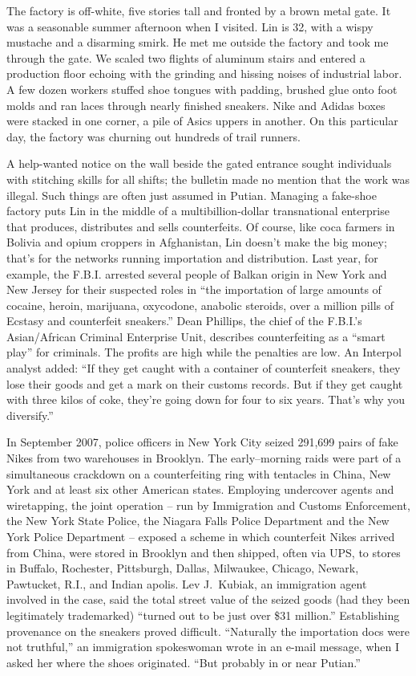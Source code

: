 ﻿\documentclass[12pt]{article}
\begin{document}
The factory is off-white, five stories tall and fronted by a brown metal gate. It was a seasonable
summer afternoon when I visited. Lin is 32, with a wispy mustache and a disarming smirk. He met me
outside the factory and took me through the gate. We scaled two flights of aluminum stairs and
entered a production floor echoing with the grinding and hissing noises of industrial labor. A few
dozen workers stuffed shoe tongues with padding, brushed glue onto foot molds and ran laces through
nearly finished sneakers. Nike and Adidas boxes were stacked in one corner, a pile of Asics uppers
in another. On this particular day, the factory was churning out hundreds of trail runners.

A help-wanted notice on the wall beside the gated entrance sought individuals with stitching skills
for all shifts; the bulletin made no mention that the work was illegal. Such things are often just
assumed in Putian. Managing a fake-shoe factory puts Lin in the middle of a multibillion-dollar
transnational enterprise that produces, distributes and sells counterfeits. Of course, like coca
farmers in Bolivia and opium croppers in Afghanistan, Lin doesn't make the big money; that's for the
networks running importation and distribution. Last year, for example, the F.B.I. arrested several
people of Balkan origin in New York and New Jersey for their suspected roles in ``the importation of
large amounts of cocaine, heroin, marijuana, oxycodone, anabolic steroids, over a million pills of
Ecstasy and counterfeit sneakers.'' Dean Phillips, the chief of the F.B.I.'s Asian/African Criminal
Enterprise Unit, describes counterfeiting as a ``smart play'' for criminals. The profits are high
while the penalties are low. An Interpol analyst added: ``If they get caught with a container of
counterfeit sneakers, they lose their goods and get a mark on their customs records. But if they get
caught with three kilos of coke, they're going down for four to six years. That's why you
diversify.''

In September 2007, police officers in New York City seized 291,699 pairs of fake Nikes from two
warehouses in Brooklyn. The early--morning raids were part of a simultaneous crackdown on a
counterfeiting ring with tentacles in China, New York and at least six other American states.
Employing undercover agents and wiretapping, the joint operation -- run by Immigration and Customs
Enforcement, the New York State Police, the Niagara Falls Police Department and the New York Police
Department -- exposed a scheme in which counterfeit Nikes arrived from China, were stored in
Brooklyn and then shipped, often via UPS, to stores in Buffalo, Rochester, Pittsburgh, Dallas,
Milwaukee, Chicago, Newark, Pawtucket, R.I., and Indian apolis. Lev J.~Kubiak, an immigration agent
involved in the case, said the total street value of the seized goods (had they been legitimately
trademarked) ``turned out to be just over \$31 million.'' Establishing provenance on the sneakers
proved difficult. ``Naturally the importation docs were not truthful,'' an immigration spokeswoman
wrote in an e-mail message, when I asked her where the shoes originated. ``But probably in or near
Putian.''
\end{document}
